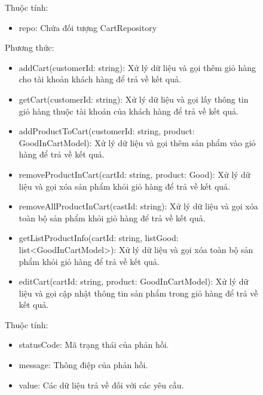 \begin{figure}[!htp]
	Thuộc tính:
	\begin{itemize}
		\item repo: Chứa đối tượng CartRepository
	\end{itemize}
	Phương thức:
	\begin{itemize}
		\item addCart(customerId: string): Xử lý dữ liệu và gọi thêm giỏ hàng cho tài khoản khách hàng để trả về kết quả.
		\item getCart(customerId: string): Xử lý dữ liệu và gọi lấy thông tin giỏ hàng thuộc tài khoản của khách hàng để trả về kết quả.
		\item addProductToCart(customerId: string, product: GoodInCartModel): Xử lý dữ liệu và gọi thêm sản phẩm vào giỏ hàng để trả về kết quả.
		\item removeProductInCart(cartId: string, product: Good): Xử lý dữ liệu và gọi xóa sản phẩm khỏi giỏ hàng để trả về kết quả.
		\item removeAllProductInCart(castId: string): Xử lý dữ liệu và gọi xóa toàn bộ sản phẩm khỏi giỏ hàng để trả về kết quả.
		\item getListProductInfo(cartId: string, listGood: list<GoodInCartModel>): Xử lý dữ liệu và gọi xóa toàn bộ sản phẩm khỏi giỏ hàng để trả về kết quả.
		\item editCart(cartId: string, product: GoodInCartModel): Xử lý dữ liệu và gọi cập nhật thông tin sản phẩm trong giỏ hàng để trả về kết quả.
	\end{itemize}

	Thuộc tính:
	\begin{itemize}
		\item statusCode: Mã trạng thái của phản hồi.
		\item message: Thông điệp của phản hồi.
		\item value: Các dữ liệu trả về đối với các yêu cầu.
	\end{itemize}


\end{figure}
